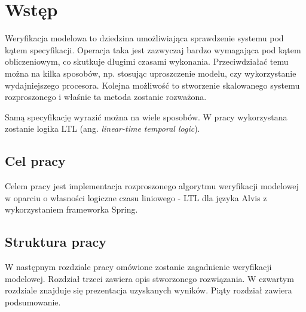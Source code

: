 \chapter{Wstęp}

Weryfikacja modelowa to dziedzina umożliwiająca sprawdzenie systemu pod kątem specyfikacji.
Operacja taka jest zazwyczaj bardzo wymagająca pod kątem obliczeniowym, co skutkuje długimi czasami wykonania. Przeciwdziałać temu można na kilka sposobów, np. stosując uproszczenie modelu, czy wykorzystanie wydajniejszego procesora. Kolejna możliwość to stworzenie skalowanego systemu rozproszonego i właśnie ta metoda zostanie rozważona.

Samą specyfikację wyrazić można na wiele sposobów. W pracy wykorzystana zostanie logika LTL (ang. \textit{linear-time temporal logic}).


\section{Cel pracy}

Celem pracy jest implementacja rozproszonego algorytmu weryfikacji modelowej w oparciu o własności logiczne czasu liniowego - LTL dla języka Alvis z wykorzystaniem frameworka Spring.


\section{Struktura pracy}

W następnym rozdziale pracy omówione zostanie zagadnienie weryfikacji modelowej.
Rozdział trzeci zawiera opis stworzonego rozwiązania.
W czwartym rozdziale znajduje się prezentacja uzyskanych wyników.
Piąty rozdział zawiera podsumowanie.
